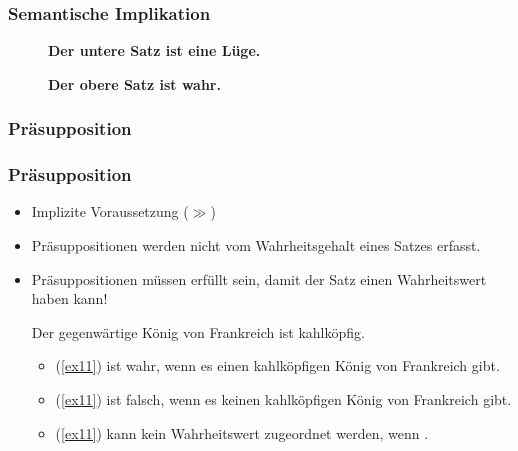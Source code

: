 \begin{frame}
\frametitle{Semantische Implikation}

\begin{figure}
	\centering
	\LARGE
	
\textbf{	Der untere Satz ist eine Lüge.}

\vspace{2cm}

\textbf{Der obere Satz ist wahr.}

\end{figure}
%
%

\end{frame}


%
\subsubsection{Präsupposition}
%

\begin{frame}
\frametitle{Präsupposition}

\begin{itemize}
	\item Implizite Voraussetzung ($\gg$)
	\item Präsuppositionen werden nicht vom Wahrheitsgehalt eines Satzes erfasst.
	\item Präsuppositionen müssen erfüllt sein, damit der Satz einen Wahrheitswert haben kann!

\vspace{1ex}

		\ea \label{ex11} Der gegenwärtige König von Frankreich ist kahlköpfig.
		\z
		
		\begin{itemize}
			\item (\ref{ex11}) ist wahr, wenn es einen kahlköpfigen König von Frankreich gibt.
			\item (\ref{ex11}) ist falsch, wenn es keinen kahlköpfigen König von Frankreich gibt.
			\item (\ref{ex11}) kann kein Wahrheitswert zugeordnet werden, wenn .
		\end{itemize}
	
\end{itemize}

\end{frame}



